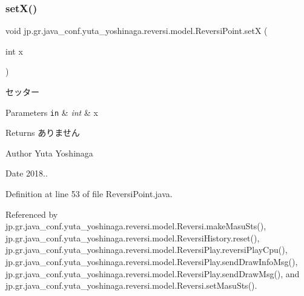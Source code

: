 \subsubsection{\texorpdfstring{set\+X()}{setX()}}
{\footnotesize\ttfamily void jp.\+gr.\+java\+\_\+conf.\+yuta\+\_\+yoshinaga.\+reversi.\+model.\+Reversi\+Point.\+setX (\begin{DoxyParamCaption}\item[{int}]{x }\end{DoxyParamCaption})}



セッター 


\begin{DoxyParams}[1]{Parameters}
\mbox{\tt in}  & {\em int} & x \\
\hline
\end{DoxyParams}
\begin{DoxyReturn}{Returns}
ありません 
\end{DoxyReturn}
\begin{DoxyAuthor}{Author}
Yuta Yoshinaga 
\end{DoxyAuthor}
\begin{DoxyDate}{Date}
2018.. 
\end{DoxyDate}


Definition at line 53 of file Reversi\+Point.\+java.



Referenced by jp.\+gr.\+java\+\_\+conf.\+yuta\+\_\+yoshinaga.\+reversi.\+model.\+Reversi.\+make\+Masu\+Sts(), jp.\+gr.\+java\+\_\+conf.\+yuta\+\_\+yoshinaga.\+reversi.\+model.\+Reversi\+History.\+reset(), jp.\+gr.\+java\+\_\+conf.\+yuta\+\_\+yoshinaga.\+reversi.\+model.\+Reversi\+Play.\+reversi\+Play\+Cpu(), jp.\+gr.\+java\+\_\+conf.\+yuta\+\_\+yoshinaga.\+reversi.\+model.\+Reversi\+Play.\+send\+Draw\+Info\+Msg(), jp.\+gr.\+java\+\_\+conf.\+yuta\+\_\+yoshinaga.\+reversi.\+model.\+Reversi\+Play.\+send\+Draw\+Msg(), and jp.\+gr.\+java\+\_\+conf.\+yuta\+\_\+yoshinaga.\+reversi.\+model.\+Reversi.\+set\+Masu\+Sts().

